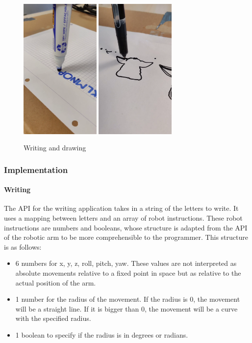 \begin{figure}[h]
    \centering
    \includegraphics[height=7cm]{images/writing.png}
    \hspace{1cm}
    \includegraphics[height=7cm]{images/drawing.png}
    \caption{Writing and drawing}
    \label{fig:writing_and_drawing}
\end{figure}

\subsubsection{Implementation}

\paragraph{Writing}

The API for the writing application takes in a string of the letters to write. It uses a mapping between letters and an array of robot instructions. These robot instructions are numbers and booleans, whose structure is adapted from the API of the robotic arm to be more comprehensible to the programmer. This structure is as follows:

\begin{itemize}
    \item 6 numbers for x, y, z, roll, pitch, yaw. These values are not interpreted as absolute movements relative to a fixed point in space but as relative to the actual position of the arm.
    \item 1 number for the radius of the movement. If the radius is 0, the movement will be a straight line. If it is bigger than 0, the movement will be a curve with the specified radius.
    \item 1 boolean to specify if the radius is in degrees or radians.
\end{itemize}

